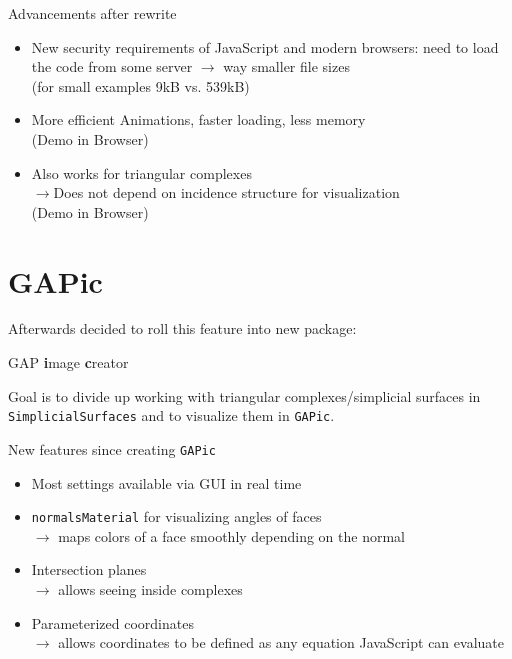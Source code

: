 \documentclass{beamer}
\numberwithin{equation}{aufgabe}
\begin{document}
\begin{frame}
    \begin{exampleblock}{Advancements after rewrite}
        \begin{itemize}[label=-]
            \item New security requirements of JavaScript and modern browsers: need to load the code from some server $\xrightarrow{}$ way smaller file sizes\\
                (for small examples 9kB vs. 539kB)
                \pause
            \item More efficient Animations, faster loading, less memory\\
                (Demo in Browser)
                \pause
            \item Also works for triangular complexes\\
            $\xrightarrow{}$Does not depend on incidence structure for visualization\\
            (Demo in Browser)
        \end{itemize}
    \end{exampleblock}
\end{frame}

\section{GAPic}
\begin{frame}
    Afterwards decided to roll this feature into new package: \\
    \begin{center}
        GAP \textbf{i}mage \textbf{c}reator    
    \end{center}
    \pause
    Goal is to divide up working with triangular complexes/simplicial surfaces in \texttt{SimplicialSurfaces} and to visualize them in \texttt{GAPic}.
\end{frame}

\begin{frame}
    \begin{exampleblock}{New features since creating \texttt{GAPic}}
        \begin{itemize}[label=-]
            \item Most settings available via GUI in real time \pause
            \item \texttt{normalsMaterial} for visualizing angles of faces\\
            $\xrightarrow{}$ maps colors of a face smoothly depending on the normal \pause
            \item Intersection planes\\
            $\xrightarrow{}$ allows seeing inside complexes \pause
            \item Parameterized coordinates \\
            $\xrightarrow{}$ allows coordinates to be defined as any equation JavaScript can evaluate
        \end{itemize}
    \end{exampleblock}
\end{frame}
\end{document}
